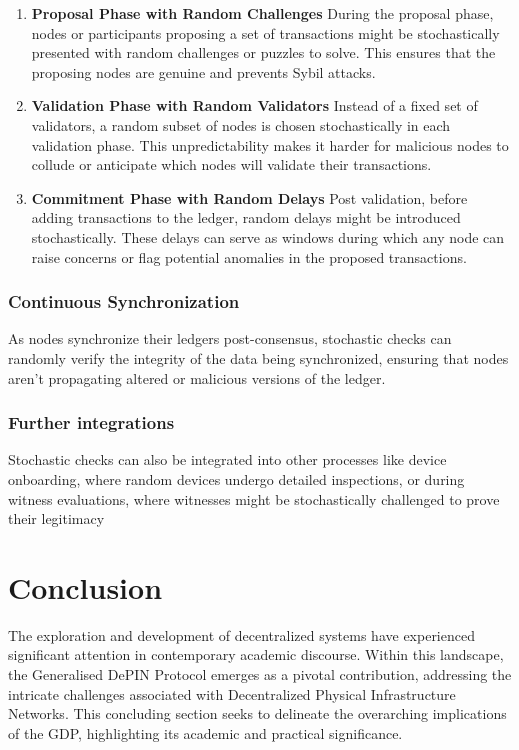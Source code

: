 \documentclass{article}
\begin{document}
\begin{enumerate}

\item \textbf{Proposal Phase with Random Challenges}
During the proposal phase, nodes or participants proposing a set of transactions might be stochastically presented with random challenges or puzzles to solve. This ensures that the proposing nodes are genuine and prevents Sybil attacks.

\item \textbf{Validation Phase with Random Validators}
Instead of a fixed set of validators, a random subset of nodes is chosen stochastically in each validation phase. This unpredictability makes it harder for malicious nodes to collude or anticipate which nodes will validate their transactions.

\item \textbf{Commitment Phase with Random Delays}
Post validation, before adding transactions to the ledger, random delays might be introduced stochastically. These delays can serve as windows during which any node can raise concerns or flag potential anomalies in the proposed transactions.

\end{enumerate}

\subsubsection{Continuous Synchronization}
As nodes synchronize their ledgers post-consensus, stochastic checks can randomly verify the integrity of the data being synchronized, ensuring that nodes aren't propagating altered or malicious versions of the ledger.

\subsubsection{Further integrations}
Stochastic checks can also be integrated into other processes like device onboarding, where random devices undergo detailed inspections, or during witness evaluations, where witnesses might be stochastically challenged to prove their legitimacy

\section{Conclusion}

The exploration and development of decentralized systems have experienced significant attention in contemporary academic discourse. Within this landscape, the Generalised DePIN Protocol emerges as a pivotal contribution, addressing the intricate challenges associated with Decentralized Physical Infrastructure Networks. This concluding section seeks to delineate the overarching implications of the GDP, highlighting its academic and practical significance.
\end{document}
